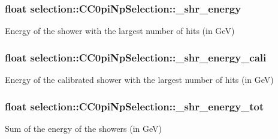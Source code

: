 \subsubsection[{\texorpdfstring{\+\_\+shr\+\_\+energy}{_shr_energy}}]{\setlength{\rightskip}{0pt plus 5cm}float selection\+::\+C\+C0pi\+Np\+Selection\+::\+\_\+shr\+\_\+energy\hspace{0.3cm}{\ttfamily [private]}}\hypertarget{classselection_1_1CC0piNpSelection_abf854f061d0476dc08ae8b3d71e7a86d}{}\label{classselection_1_1CC0piNpSelection_abf854f061d0476dc08ae8b3d71e7a86d}
Energy of the shower with the largest number of hits (in GeV) 
\subsubsection[{\texorpdfstring{\+\_\+shr\+\_\+energy\+\_\+cali}{_shr_energy_cali}}]{\setlength{\rightskip}{0pt plus 5cm}float selection\+::\+C\+C0pi\+Np\+Selection\+::\+\_\+shr\+\_\+energy\+\_\+cali\hspace{0.3cm}{\ttfamily [private]}}\hypertarget{classselection_1_1CC0piNpSelection_a910f18dc66ac2f22aa8cbdd6b86c7d0e}{}\label{classselection_1_1CC0piNpSelection_a910f18dc66ac2f22aa8cbdd6b86c7d0e}
Energy of the calibrated shower with the largest number of hits (in GeV) 
\subsubsection[{\texorpdfstring{\+\_\+shr\+\_\+energy\+\_\+tot}{_shr_energy_tot}}]{\setlength{\rightskip}{0pt plus 5cm}float selection\+::\+C\+C0pi\+Np\+Selection\+::\+\_\+shr\+\_\+energy\+\_\+tot\hspace{0.3cm}{\ttfamily [private]}}\hypertarget{classselection_1_1CC0piNpSelection_a6e42f011e79f646f36df7148907d1b59}{}\label{classselection_1_1CC0piNpSelection_a6e42f011e79f646f36df7148907d1b59}
Sum of the energy of the showers (in GeV) 

